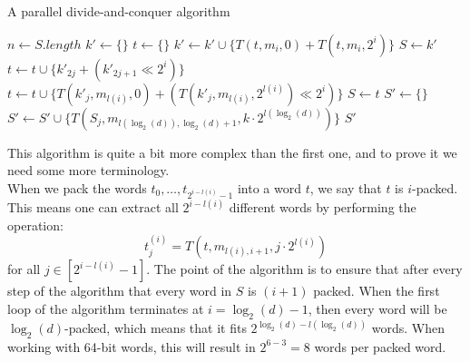 \begin{algorithm}[H]
\caption{A parallel divide-and-conquer algorithm}\label{alg:parallel-d-and-c}
    \begin{algorithmic}[1]
         
            \State $n \gets S.length$
                \State $k' \gets \{\}$
                \State $t \gets \{\}$
                    \State $k' \gets k' \cup \{T(t, m_i, 0) + T(t, m_i, 2^i)\}$
                \EndFor
                    \State $S \gets k'$
                \Else
                    \State $t \gets t \cup \{k'_{2j} + (k'_{2j+1} \ll 2^i)\}$ %
                    \EndFor
                \Else
                        \State $t \gets t \cup \{T(k'_{j}, m_{l(i)}, 0) + (T(k'_{j}, m_{l(i)}, 2^{l(i)}) \ll 2^{i})\}$
                    \EndFor
                \EndIf
                \State $S \gets t$
                \EndIf
            \EndFor
            \State $S' \gets \{\}$
             
                \State $S' \gets S' \cup \{T(S_j, m_{l(\log_2(d)), \log_2(d) + 1}, k\cdot 2^{l(\log_2(d))})\}$
                \EndFor
            \EndFor
            \State \Return $S'$
        \EndFunction
    \end{algorithmic}
\end{algorithm}
This algorithm is quite a bit more complex than the first one, and to prove it we need some more terminology.\\
When we pack the words $t_0, \dots, t_{2^{i-l(i)}-1}$ into a word $t$, we say that $t$ is $i$-packed. This means one can extract all $2^{i-l(i)}$ different words by performing the operation:
\begin{equation}
    \label{eq:extract-from-embed}
t^{(i)}_j=T(t, m_{l(i), i+1}, j\cdot 2^{l(i)})
\end{equation}
for all $j\in [2^{i-l(i)}-1]$.
The point of the algorithm is to ensure that after every step of the algorithm that every word in $S$ is $(i+1)$ packed. When the first loop of the algorithm terminates at $i=\log_2(d)-1$, then every word will be $\log_2(d)$-packed, which means that it fits $2^{\log_2(d)-l(\log_2(d))}$ words. When working with 64-bit words, this will result in $2^{6-3}=8$ words per packed word.
